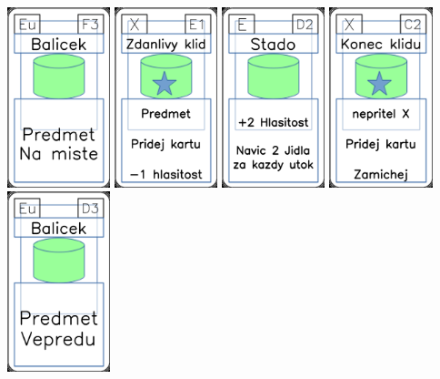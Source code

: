 \documentclass[a4paper]{article}
\begin{document}
	\includegraphics[width=3.0cm]{img-4_27}
	\includegraphics[width=3.0cm]{img-5_20}
	\includegraphics[width=3.0cm]{img-4_46}
	\includegraphics[width=3.0cm]{img-5_11}
	\includegraphics[width=3.0cm]{img-4_17}
\end{document}
